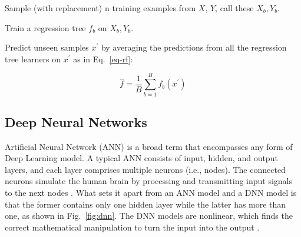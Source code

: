 \noindent
\begin{myenumerate}
  \item Sample (with replacement) n training examples from $X$, $Y$, call these $X_b, Y_b$.
  \item Train a regression tree $f_b$ on $X_b, Y_b$.
  \item Predict unseen samples $x^{'}$ by averaging the predictions from all the regression tree learners on $x^{'}$ as in Eq.~\ref{eq-rf}:
\end{myenumerate}

\begin{equation}\label{eq-rf}
  \hat{f}=\frac{1}{B}\sum_{b=1}^{B}f_b(x^{'})
\end{equation}

\subsection{Deep Neural Networks}
Artificial Neural Network (ANN) is a broad term that encompasses any form of Deep Learning model. A typical ANN consists of input, hidden, and output layers, and each layer comprises multiple neurons (i.e., nodes). The connected neurons simulate the human brain by processing and transmitting input signals to the next nodes \citep{mohseni-dargahChapter12Machine2022}. What sets it apart from an ANN model and a DNN model is that the former contains only one hidden layer while the latter has more than one, as shown in Fig.~\ref{fig:dnn}. The DNN models are nonlinear, which finds the correct mathematical manipulation to turn the input into the output \citep{bangaloreaiDeepNeuralNetwork2018}.

